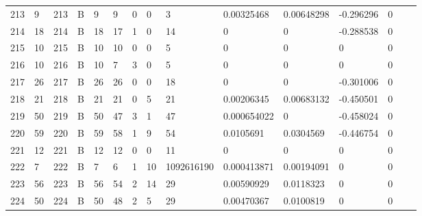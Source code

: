 \begin{longtable}{lllllllllllllll}
	213 & 9                 & 213 & B   & 9                 & 9                 & 0                 & 0    & 3          & 0.00325468     & 0.00648298     & -0.296296     & 0            \\
	214 & 18                & 214 & B   & 18                & 17                & 1                 & 0    & 14         & 0              & 0              & -0.288538     & 0            \\
	215 & 10                & 215 & B   & 10                & 10                & 0                 & 0    & 5          & 0              & 0              & 0             & 0            \\
	216 & 10                & 216 & B   & 10                & 7                 & 3                 & 0    & 5          & 0              & 0              & 0             & 0            \\
	217 & 26                & 217 & B   & 26                & 26                & 0                 & 0    & 18         & 0              & 0              & -0.301006     & 0            \\
	218 & 21                & 218 & B   & 21                & 21                & 0                 & 5    & 21         & 0.00206345     & 0.00683132     & -0.450501     & 0            \\
	219 & 50                & 219 & B   & 50                & 47                & 3                 & 1    & 47         & 0.000654022    & 0              & -0.458024     & 0            \\
	220 & 59                & 220 & B   & 59                & 58                & 1                 & 9    & 54         & 0.0105691      & 0.0304569      & -0.446754     & 0            \\
	221 & 12                & 221 & B   & 12                & 12                & 0                 & 0    & 11         & 0              & 0              & 0             & 0            \\
	222 & 7                 & 222 & B   & 7                 & 6                 & 1                 & 10   & 1092616190 & 0.000413871    & 0.00194091     & 0             & 0            \\
	223 & 56                & 223 & B   & 56                & 54                & 2                 & 14   & 29         & 0.00590929     & 0.0118323      & 0             & 0            \\
	224 & 50                & 224 & B   & 50                & 48                & 2                 & 5    & 29         & 0.00470367     & 0.0100819      & 0             & 0            \\

\end{longtable}

